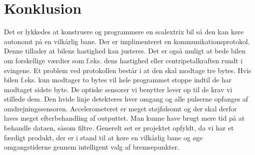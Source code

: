 \section{Konklusion}
Det er lykkedes at konstruere og programmere en scalextrix bil så den kan køre autonomt på en vilkårlig bane. Der er implimenteret en kommunikationsprotokol. Denne tillader at bilens hastighed kan justeres. Det er også muligt at bede bilen om forskellige værdier som f.eks. dens hastighed eller centripetalkraften rundt i svingene. Et problem ved protokollen består i at den skal modtage tre bytes. Hvis bilen f.eks. kun modtager to bytes vil hele programmet stoppe indtil de har modtaget sidste byte.  
De optiske sensorer vi benytter lever op til de krav vi stillede dem. Den hvide linje detekteres hver omgang og alle pulserne opfanges af omdrejningssensoren. Accelerometeret er meget støjfølsomt og der skal derfor laves meget efterbehandling af outputtet. Man kunne have brugt mere tid på at behandle dataen, såsom filtre. 
Generelt set er projektet opfyldt, da vi har et færdigt produkt, der er i stand til at køre en vilkårlig bane og øge omgangstiderne gennem intelligent valg af bremsepunkter. 

















